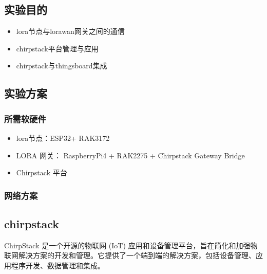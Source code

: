 \documentclass[a4paper,12pt,english]{sphinxmanual}
\begin{document}
{{\subsection{实验目的}
\label{\detokenize{exp-lora/lorawan-esp32:id1}}\begin{itemize}
\item {} 
\sphinxAtStartPar
lora节点与lorawan网关之间的通信

\item {} 
\sphinxAtStartPar
chirpstack平台管理与应用

\item {} 
\sphinxAtStartPar
chirpstack与thingsboard集成

\end{itemize}


\subsection{实验方案}
\label{\detokenize{exp-lora/lorawan-esp32:id2}}

\subsubsection{所需软硬件}
\label{\detokenize{exp-lora/lorawan-esp32:id3}}\begin{itemize}
\item {} 
\sphinxAtStartPar
lora节点：ESP32+ RAK3172

\item {} 
\sphinxAtStartPar
LORA 网关： RaspberryPi4 + RAK2275 + Chirpstack Gateway Bridge

\item {} 
\sphinxAtStartPar
Chirpstack 平台

\end{itemize}


\subsubsection{网络方案}
\label{\detokenize{exp-lora/lorawan-esp32:id4}}
\sphinxAtStartPar
{}


\subsection{chirpstack}
\label{\detokenize{exp-lora/lorawan-esp32:chirpstack}}
\sphinxAtStartPar
ChirpStack 是一个开源的物联网 (IoT) 应用和设备管理平台，旨在简化和加强物联网解决方案的开发和管理。它提供了一个端到端的解决方案，包括设备管理、应用程序开发、数据管理和集成。

}}
\end{document}
